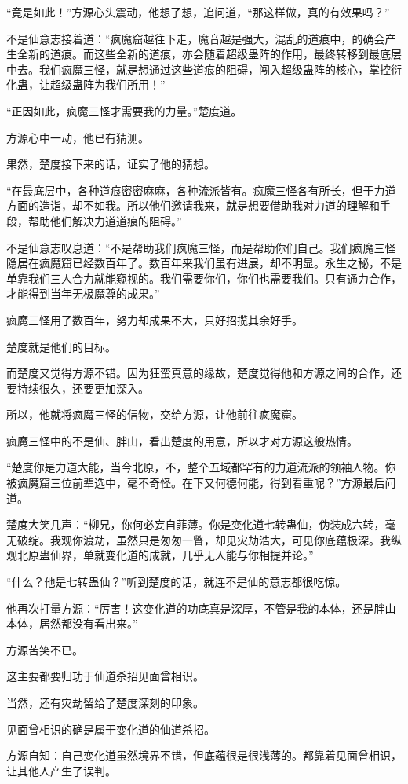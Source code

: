 \begin{this_body}
“竟是如此！”方源心头震动，他想了想，追问道，“那这样做，真的有效果吗？”

不是仙意志接着道：“疯魔窟越往下走，魔音越是强大，混乱的道痕中，的确会产生全新的道痕。而这些全新的道痕，亦会随着超级蛊阵的作用，最终转移到最底层中去。我们疯魔三怪，就是想通过这些道痕的阻碍，闯入超级蛊阵的核心，掌控衍化蛊，让超级蛊阵为我们所用！”

“正因如此，疯魔三怪才需要我的力量。”楚度道。

方源心中一动，他已有猜测。

果然，楚度接下来的话，证实了他的猜想。

“在最底层中，各种道痕密密麻麻，各种流派皆有。疯魔三怪各有所长，但于力道方面的造诣，却不如我。所以他们邀请我来，就是想要借助我对力道的理解和手段，帮助他们解决力道道痕的阻碍。”

不是仙意志叹息道：“不是帮助我们疯魔三怪，而是帮助你们自己。我们疯魔三怪隐居在疯魔窟已经数百年了。数百年来我们虽有进展，却不明显。永生之秘，不是单靠我们三人合力就能窥视的。我们需要你们，你们也需要我们。只有通力合作，才能得到当年无极魔尊的成果。”

疯魔三怪用了数百年，努力却成果不大，只好招揽其余好手。

楚度就是他们的目标。

而楚度又觉得方源不错。因为狂蛮真意的缘故，楚度觉得他和方源之间的合作，还要持续很久，还要更加深入。

所以，他就将疯魔三怪的信物，交给方源，让他前往疯魔窟。

疯魔三怪中的不是仙、胖山，看出楚度的用意，所以才对方源这般热情。

“楚度你是力道大能，当今北原，不，整个五域都罕有的力道流派的领袖人物。你被疯魔窟三位前辈选中，毫不奇怪。在下又何德何能，得到看重呢？”方源最后问道。

楚度大笑几声：“柳兄，你何必妄自菲薄。你是变化道七转蛊仙，伪装成六转，毫无破绽。我观你渡劫，虽然只是匆匆一瞥，却见灾劫浩大，可见你底蕴极深。我纵观北原蛊仙界，单就变化道的成就，几乎无人能与你相提并论。”

“什么？他是七转蛊仙？”听到楚度的话，就连不是仙的意志都很吃惊。

他再次打量方源：“厉害！这变化道的功底真是深厚，不管是我的本体，还是胖山本体，居然都没有看出来。”

方源苦笑不已。

这主要都要归功于仙道杀招见面曾相识。

当然，还有灾劫留给了楚度深刻的印象。

见面曾相识的确是属于变化道的仙道杀招。

方源自知：自己变化道虽然境界不错，但底蕴很是很浅薄的。都靠着见面曾相识，让其他人产生了误判。


\end{this_body}
